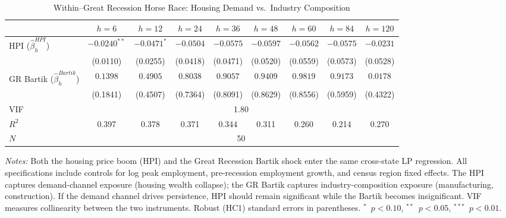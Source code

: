 \begin{table}[H]
\centering
\caption{Within--Great Recession Horse Race: Housing Demand vs.\ Industry Composition}
\begin{threeparttable}
\small
\begin{tabular}{lcccccccc}
\toprule
& $h=6$ & $h=12$ & $h=24$ & $h=36$ & $h=48$ & $h=60$ & $h=84$ & $h=120$ \\
\midrule
HPI ($\hat{\beta}^{HPI}_h$) & $-0.0240^{**}$ & $-0.0471^{*}$ & $-0.0504$ & $-0.0575$ & $-0.0597$ & $-0.0562$ & $-0.0575$ & $-0.0231$ \\
& (0.0110) & (0.0255) & (0.0418) & (0.0471) & (0.0520) & (0.0559) & (0.0573) & (0.0528) \\[3pt]
GR Bartik ($\hat{\beta}^{Bartik}_h$) & $0.1398$ & $0.4905$ & $0.8038$ & $0.9057$ & $0.9409$ & $0.9819$ & $0.9173$ & $0.0178$ \\
& (0.1841) & (0.4507) & (0.7364) & (0.8091) & (0.8629) & (0.8556) & (0.5959) & (0.4322) \\
\midrule
VIF & \multicolumn{8}{c}{1.80} \\
$R^2$ & 0.397 & 0.378 & 0.371 & 0.344 & 0.311 & 0.260 & 0.214 & 0.270 \\
\midrule
$N$ & \multicolumn{8}{c}{50} \\
\bottomrule
\end{tabular}
\begin{tablenotes}[flushleft]
\small
\item \textit{Notes:} Both the housing price boom (HPI) and the Great Recession Bartik shock enter the same cross-state LP regression. All specifications include controls for log peak employment, pre-recession employment growth, and census region fixed effects. The HPI captures demand-channel exposure (housing wealth collapse); the GR Bartik captures industry-composition exposure (manufacturing, construction). If the demand channel drives persistence, HPI should remain significant while the Bartik becomes insignificant. VIF measures collinearity between the two instruments. Robust (HC1) standard errors in parentheses. $^{*}$~$p<0.10$, $^{**}$~$p<0.05$, $^{***}$~$p<0.01$.
\end{tablenotes}
\end{threeparttable}
\label{tab:horse_race}
\end{table}
